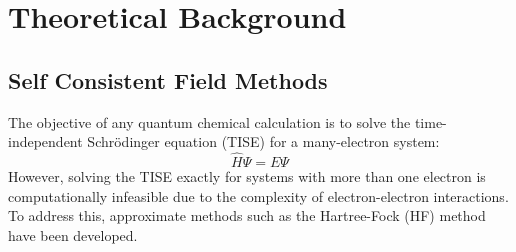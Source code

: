 \chapter{Theoretical Background}\label{ch:theory}

\section{Self Consistent Field Methods} \label{sec:SCF}
The objective of any quantum chemical calculation is to solve the time-independent Schrödinger equation (TISE) for a many-electron system:
\begin{equation}\label{eq:TISE}
    \hat{H} \Psi = E \Psi
\end{equation}
However, solving the TISE exactly for systems with more than one electron is computationally infeasible due to the complexity of electron-electron interactions. To address this, approximate methods such as the Hartree-Fock (HF) method have been developed\cite{szabo1996modern}.

